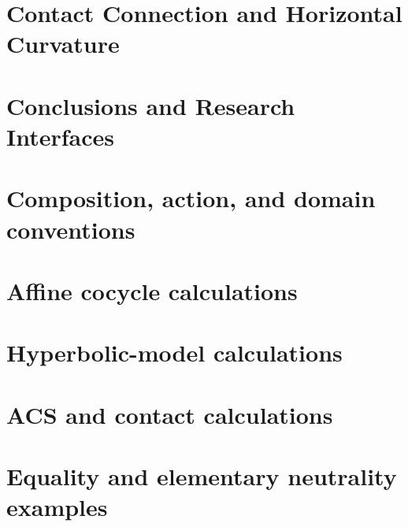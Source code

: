 \documentclass[11pt]{article}
\theoremstyle{definition}
\theoremstyle{remark}
\begin{document}
\section{Contact Connection and Horizontal Curvature}\label{sec:contact-curvature}


\section{Conclusions and Research Interfaces}\label{sec:conclusion}


\appendix

\section{Composition, action, and domain conventions}\label{app:conventions}


\section{Affine cocycle calculations}\label{app:affine-cocycles}


\section{Hyperbolic-model calculations}\label{app:hyperbolic-calculations}


\section{ACS and contact calculations}\label{app:acs-contact}


\section{Equality and elementary neutrality examples}\label{app:equality-neutrality}




\end{document}
